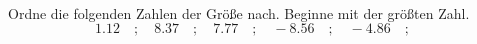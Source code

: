 \begin{aufgabe} ~ \\ 
Ordne die folgenden Zahlen der Größe nach. Beginne mit der größten Zahl.\[1.12\quad ; \quad8.37\quad ; \quad7.77\quad ; \quad-8.56\quad ; \quad-4.86\quad ; \quad\]\underline{\hspace{12cm}}\end{aufgabe} 
